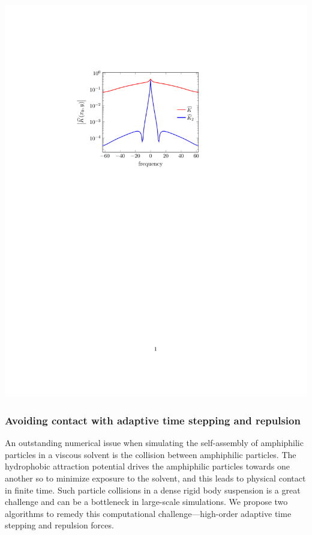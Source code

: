 \includegraphics[scale=1]{figures/integrands.pdf}

\subsubsection{Avoiding contact with adaptive time stepping and
repulsion}
\label{subsec:timeStepping}

An outstanding numerical issue when simulating the
self-assembly of amphiphilic particles in a viscous solvent is the
collision between amphiphilic particles. The hydrophobic attraction
potential drives the amphiphilic particles towards one another so to
minimize exposure to the solvent, and this leads to physical contact in
finite time. Such particle collisions in a dense rigid body suspension
is a great challenge and can be a bottleneck in large-scale simulations.
We propose two algorithms to remedy this computational
challenge---high-order adaptive time stepping and repulsion forces.

